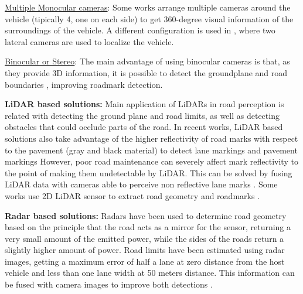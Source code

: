 \underline{Multiple Monocular cameras}: 
Some works \cite{lee2017avm, kum2013lane} arrange multiple cameras 
around the vehicle (tipically 4, one on each side) to get 360-degree 
visual information of the surroundings of the vehicle. 
A different configuration is used in \cite{Ieng2003}, where two lateral cameras
are used to localize the vehicle. 

\underline{Binocular or Stereo}: 
The main advantage of using binocular cameras is that, as they provide 3D 
information, it is possible to detect the groundplane and road boundaries 
\cite{schreiber2013laneloc, ozgunalp2017multiple}, improving roadmark 
detection. 

\textbf{LiDAR based solutions:}
Main application of LiDARs in road perception is related with detecting the 
ground plane and road limits, as well as detecting obstacles that could occlude 
parts of the road.
In recent works, LiDAR based solutions also take advantage of the higher 
reflectivity of road marks with respect to the pavement (gray and black material) to 
detect lane markings \cite{yang2012automated, li2013new} and pavement markings \cite{Zhang2016}
However, poor road maintenance can severely affect mark reflectivity to the 
point of making them undetectable by LiDAR. This can be solved by fusing LiDAR 
data with cameras able to perceive non reflective lane marks \cite{lee2017avm}.
Some works use 2D LiDAR sensor to extract road geometry and roadmarks \cite{nie2012camera, kim2015lane}.


\textbf{Radar based solutions:}
Radars have been used to determine road geometry based on the principle that the
road acts as a mirror for the sensor, returning a very small amount of the 
emitted power, while the sides of the roads return a slightly higher 
amount of power. Road limits have been estimated using radar images, getting a 
maximum error of half a lane at zero distance from the host vehicle and less 
than one lane width at 50 meters distance. This information can be fused with
camera images to improve both detections 
\cite{kaliyaperumal2001algorithm, ma2000simultaneous, Janda2013}.

